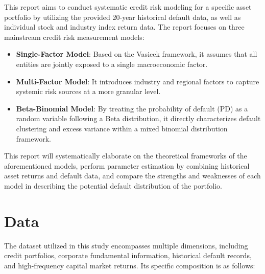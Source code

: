 \documentclass[12pt]{article}
\begin{document}
This report aims to conduct systematic credit risk modeling for a specific asset portfolio by utilizing the provided 20-year historical default data, as well as individual stock and industry index return data. The report focuses on three mainstream credit risk measurement models:

\begin{itemize}
\item \textbf{Single-Factor Model}: Based on the Vasicek framework, it assumes that all entities are jointly exposed to a single macroeconomic factor.


\item \textbf{Multi-Factor Model}: It introduces industry and regional factors to capture systemic risk sources at a more granular level.


\item \textbf{Beta-Binomial Model}: By treating the probability of default (PD) as a random variable following a Beta distribution, it directly characterizes default clustering and excess variance within a mixed binomial distribution framework.


\end{itemize}
This report will systematically elaborate on the theoretical frameworks of the aforementioned models, perform parameter estimation by combining historical asset returns and default data, and compare the strengths and weaknesses of each model in describing the potential default distribution of the portfolio.





\section{Data}
The dataset utilized in this study encompasses multiple dimensions, including credit portfolios, corporate fundamental information, historical default records, and high-frequency capital market returns. Its specific composition is as follows:
\end{document}

